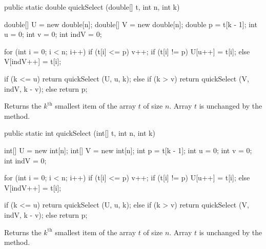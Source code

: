 \begin{code}

   public static double quickSelect (double[] t, int n, int k)\begin{hide} {
      double[] U = new double[n];
      double[] V = new double[n];
      double p = t[k - 1];
      int u = 0;
      int v = 0;
      int indV = 0;

      for (int i = 0; i < n; i++) {
         if (t[i] <= p) {
            v++;
            if (t[i] != p) {
               U[u++] = t[i];
            }
         } else
            V[indV++] = t[i];
      }

      if (k <= u)
         return quickSelect (U, u, k);
      else if (k > v)
         return quickSelect (V, indV, k - v);
      else return p;
   }\end{hide}
\end{code}
\begin{tabb}
   Returns the $k^{\mbox{th}}$ smallest item of the array $t$ of size $n$.
   Array $t$ is unchanged by the method.
\end{tabb}
\begin{htmlonly}
\end{htmlonly}
\begin{code}

   public static int quickSelect (int[] t, int n, int k)\begin{hide} {
      int[] U = new int[n];
      int[] V = new int[n];
      int p = t[k - 1];
      int u = 0;
      int v = 0;
      int indV = 0;

      for (int i = 0; i < n; i++) {
         if (t[i] <= p) {
            v++;
            if (t[i] != p) {
               U[u++] = t[i];
            }
         } else
            V[indV++] = t[i];
      }

      if (k <= u)
         return quickSelect (U, u, k);
      else if (k > v)
         return quickSelect (V, indV, k - v);
      else return p;
   }\end{hide}
\end{code}
\begin{tabb}
   Returns the $k^{\mbox{th}}$ smallest item of the array $t$ of size $n$.
   Array $t$ is unchanged by the method.
\end{tabb}
\begin{htmlonly}
\end{htmlonly}
